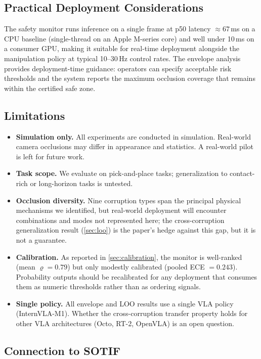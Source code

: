 \documentclass[letterpaper]{IEEEtran}
\renewcommand{\rho}{\varrho}
\begin{document}
\subsection{Practical Deployment Considerations}

The safety monitor runs inference on a single frame at p50 latency $\approx 67$\,ms on a CPU baseline (single-thread on an Apple M-series core) and well under 10\,ms on a consumer GPU, making it suitable for real-time deployment alongside the manipulation policy at typical 10--30\,Hz control rates.
The envelope analysis provides deployment-time guidance: operators can specify acceptable risk thresholds and the system reports the maximum occlusion coverage that remains within the certified safe zone.

\subsection{Limitations}

\begin{itemize}
    \item \textbf{Simulation only.} All experiments are conducted in simulation. Real-world camera occlusions may differ in appearance and statistics. A real-world pilot is left for future work.
    \item \textbf{Task scope.} We evaluate on pick-and-place tasks; generalization to contact-rich or long-horizon tasks is untested.
    \item \textbf{Occlusion diversity.} Nine corruption types span the principal physical mechanisms we identified, but real-world deployment will encounter combinations and modes not represented here; the cross-corruption generalization result (\cref{sec:loo}) is the paper's hedge against this gap, but it is not a guarantee.
    \item \textbf{Calibration.} As reported in \cref{sec:calibration}, the monitor is well-ranked (mean $\rho = 0.79$) but only modestly calibrated (pooled ECE $= 0.243$). Probability outputs should be recalibrated for any deployment that consumes them as numeric thresholds rather than as ordering signals.
    \item \textbf{Single policy.} All envelope and LOO results use a single VLA policy (InternVLA-M1). Whether the cross-corruption transfer property holds for other VLA architectures (Octo, RT-2, OpenVLA) is an open question.
\end{itemize}

\subsection{Connection to SOTIF}
\label{sec:sotif}
\end{document}
